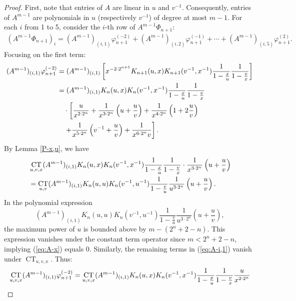 \documentclass[10pt,a4paper]{amsart}
\def\CT{\mathop{\mathrm{CT}}}
\begin{document}
\begin{proof}
First, note that entries of $A$ are linear in $u$ and $v^{-1}$. Consequently, entries of $A^{m-1}$ are polynomials in $u$ (respectively $v^{-1}$) of degree at most $m-1$. For each $i$ from 1 to 5, consider the $i$-th row of $A^{m-1}\Phi_{n+1}$:
\begin{align}
(A^{m-1}\Phi_{n+1})_{i} = (A^{m-1})_{(i,1)}\varphi_{n+1}^{(-2)} + (A^{m-1})_{(i,2)}\varphi_{n+1}^{(-1)} + \cdots + (A^{m-1})_{(i,5)}\varphi_{n+1}^{(2)}.\label{eq:A-i-row}
\end{align}
Focusing on the first term:
\begin{align}
(A^{m-1})_{(i,1)}\varphi_{n+1}^{(-2)}
&= (A^{m-1})_{(i,1)} \left[ x^{-2\cdot2^{n+1}} K_{n+1}(u,x) K_{n+1}(v^{-1},x^{-1}) \frac{1}{1 - \frac{x}{u}} \frac{1}{1 - \frac{v}{x}} \right] \notag \\
&= (A^{m-1})_{(i,1)} K_{n}(u,x) K_{n}(v^{-1},x^{-1}) \frac{1}{1 - \frac{x}{u}} \frac{1}{1 - \frac{v}{x}} \notag \\
&\quad \cdot \left[ \frac{u}{x^{2\cdot2^{n}}} + \frac{1}{x^{3\cdot2^{n}}} \left( u + \frac{u}{v} \right) + \frac{1}{x^{4\cdot2^{n}}} \left( 1 + 2\frac{u}{v} \right) \right. \notag \\
&\quad \left. + \frac{1}{x^{5\cdot2^{n}}} \left( v^{-1} + \frac{u}{v} \right) + \frac{1}{x^{6\cdot2^{n}} v} \right]. \label{eq:A-i,1}
\end{align}
By Lemma \ref{P-x,u}, we have
\begin{align}
&\CT_{u,v,x} (A^{m-1})_{(i,1)} K_{n}(u,x) K_{n}(v^{-1},x^{-1}) \frac{1}{1 - \frac{x}{u}} \frac{1}{1 - \frac{v}{x}} \cdot \frac{1}{x^{3\cdot2^{n}}} \left( u + \frac{u}{v} \right) \notag \\
&= \CT_{u,v} (A^{m-1})_{(i,1)} K_{n}(u,u) K_{n}(v^{-1},u^{-1}) \frac{1}{1 - \frac{v}{u}} \frac{1}{u^{3\cdot2^{n}}} \left( u + \frac{u}{v} \right). \label{eq:A-x}
\end{align}
In the polynomial expression
\[
(A^{m-1})_{(i,1)} K_{n}(u,u) K_{n}(v^{-1},u^{-1}) \frac{1}{1 - \frac{v}{u}} \frac{1}{u^{3\cdot2^{n}}} \left( u + \frac{u}{v} \right),
\]
the maximum power of $u$ is bounded above by $m - (2^{n} + 2 - n)$. This expression vanishes under the constant term operator since $m < 2^{n} + 2 - n$, implying (\ref{eq:A-x}) equals $0$. Similarly, the remaining terms in (\ref{eq:A-i,1}) vanish under $\CT_{u,v,x}$. Thus:
\begin{align}
\CT_{u,v,x} (A^{m-1})_{(i,1)} \varphi_{n+1}^{(-2)}
&= \CT_{u,v,x} (A^{m-1})_{(i,1)} K_{n}(u,x) K_{n}(v^{-1},x^{-1}) \frac{1}{1 - \frac{x}{u}} \frac{1}{1 - \frac{v}{x}} \frac{u}{x^{2\cdot2^{n}}} \notag \\

\end{align}
\end{proof}
\end{document}
